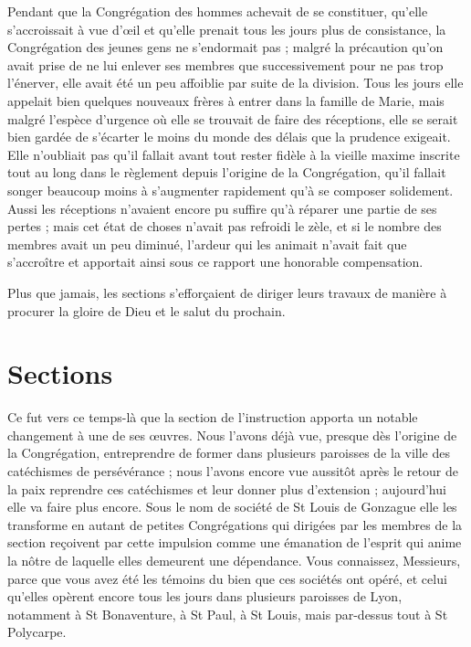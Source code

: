 Pendant que la Congrégation des hommes achevait de se constituer, qu'elle s'accroissait à vue d'œil et qu'elle prenait tous les jours plus de consistance, la Congrégation des jeunes gens ne s'endormait pas ; malgré la précaution qu'on avait prise de ne lui enlever ses membres que successivement pour ne pas trop l'énerver, elle avait été un peu affoiblie par suite de la division. Tous les jours elle appelait bien quelques nouveaux frères à entrer dans la famille de Marie, mais malgré l'espèce d'urgence où elle se trouvait de faire des réceptions, elle se serait bien gardée de s'écarter le moins du monde des délais que la prudence exigeait. Elle n'oubliait pas qu'il fallait avant tout rester fidèle à la vieille maxime inscrite tout au long dans le règlement depuis l'origine de la Congrégation, qu'il fallait songer beaucoup moins à s'augmenter rapidement qu'à se composer solidement. Aussi les réceptions n'avaient encore pu suffire qu'à réparer une partie de ses pertes ; mais cet état de choses n'avait pas refroidi le zèle, et si le nombre des membres avait un peu diminué, l'ardeur qui les animait n'avait fait que s'accroître et apportait ainsi sous ce rapport une honorable compensation.

Plus que jamais, les sections s'efforçaient de diriger leurs travaux de manière à procurer la gloire de Dieu et le salut du prochain.

\section*{Sections}
Ce fut vers ce temps-là que la section de l'instruction apporta un notable changement à une de ses œuvres. Nous l'avons déjà vue, presque dès l'origine de la Congrégation, entreprendre
de former dans plusieurs paroisses de la ville des catéchismes de persévérance ; nous l'avons encore vue aussitôt après le retour de la paix reprendre ces catéchismes et leur donner plus d'extension ; aujourd'hui elle va faire plus encore. Sous le nom de société de St Louis de Gonzague elle les transforme en autant de petites Congrégations qui dirigées par les membres de la section reçoivent par cette impulsion comme une émanation de l'esprit qui anime la nôtre de laquelle elles demeurent une dépendance. Vous connaissez, Messieurs, parce que vous avez été les témoins du bien que ces sociétés ont opéré, et celui qu'elles opèrent encore tous les jours dans plusieurs paroisses de Lyon, notamment à St Bonaventure, à St Paul, à St Louis, mais par-dessus tout à St Polycarpe.

